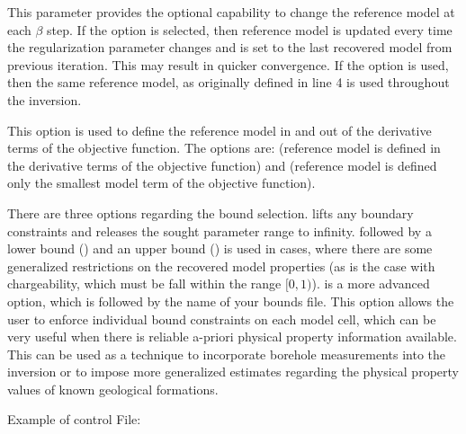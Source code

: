 \begin{description}[leftmargin=5cm, style=sameline, align=left]
\item[\codeName{CHANGE\_MREF \textbar  NOT\_CHANGE\_MREF}] This parameter provides the optional capability to change the reference model at each $\beta$ step. If the  option is selected, then reference model is updated every time the regularization parameter changes and is set to the last recovered model from previous iteration. This may result in quicker convergence. If the  option is used, then the same reference model, as originally defined in line 4 is used throughout the inversion.
\item[\codeName{SMOOTH\_MOD \textbar SMOOTH\_MOD\_DIF}] This option is used to define the reference model in and out of the derivative terms of the objective function. The options are:  (reference model is defined in the derivative terms of the objective function) and  (reference model is defined only the smallest model term of the objective function).
\item[\codeName{BOUNDS}] There are three options regarding the bound selection.  lifts any boundary constraints and releases the sought parameter range to infinity.  followed by a lower bound () and an upper bound () is used in cases, where there are some generalized restrictions on the recovered model properties (as is the case with chargeability, which must be fall within the range $[0,1)$).  is a more advanced option, which is followed by the name of your bounds file. This option allows the user to enforce individual bound constraints on each model cell, which can be very useful when there is reliable a-priori physical property information available. This can be used as a technique to incorporate borehole measurements into the inversion or to impose more generalized estimates regarding the physical property values of known geological formations.
\end{description}

Example of  control File: 

